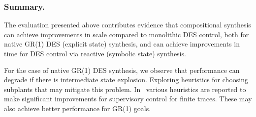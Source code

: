 
\subsubsection{Summary.}

The evaluation presented above contributes evidence that compositional synthesis can achieve improvements in scale compared to monolithic DES control, both for native GR(1) DES (explicit state) synthesis, and can achieve improvements in time for DES control via reactive (symbolic state) synthesis. 

For the case of native GR(1) DES synthesis, we observe that performance can degrade if there is intermediate state explosion. Exploring heuristics for choosing subplants that may mitigate this problem. In~\cite{mohajerani_framework_2014} various heuristics are reported to make significant improvements for supervisory control for finite traces. These may also achieve better performance for GR(1) goals.






%

